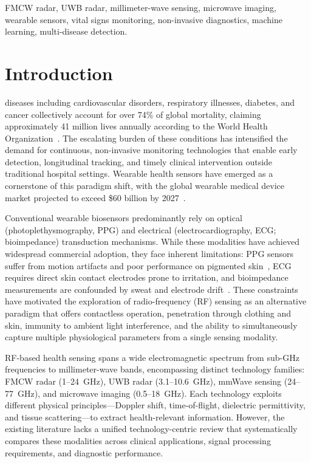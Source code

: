 \documentclass[journal,twoside]{IEEEtran}
\begin{document}
\begin{IEEEkeywords}
FMCW radar, UWB radar, millimeter-wave sensing, microwave imaging, wearable sensors, vital signs monitoring, non-invasive diagnostics, machine learning, multi-disease detection.
\end{IEEEkeywords}

\section{Introduction}

 diseases including cardiovascular disorders, respiratory illnesses, diabetes, and cancer collectively account for over 74\% of global mortality, claiming approximately 41 million lives annually according to the World Health Organization~\cite{ref_who2024}. The escalating burden of these conditions has intensified the demand for continuous, non-invasive monitoring technologies that enable early detection, longitudinal tracking, and timely clinical intervention outside traditional hospital settings. Wearable health sensors have emerged as a cornerstone of this paradigm shift, with the global wearable medical device market projected to exceed \$60 billion by 2027~\cite{ref_market2024}.

Conventional wearable biosensors predominantly rely on optical (photoplethysmography, PPG) and electrical (electrocardiography, ECG; bioimpedance) transduction mechanisms. While these modalities have achieved widespread commercial adoption, they face inherent limitations: PPG sensors suffer from motion artifacts and poor performance on pigmented skin~\cite{ref_ppg_limits2023}, ECG requires direct skin contact electrodes prone to irritation, and bioimpedance measurements are confounded by sweat and electrode drift~\cite{ref_bioimpedance2024}. These constraints have motivated the exploration of radio-frequency (RF) sensing as an alternative paradigm that offers contactless operation, penetration through clothing and skin, immunity to ambient light interference, and the ability to simultaneously capture multiple physiological parameters from a single sensing modality.

RF-based health sensing spans a wide electromagnetic spectrum from sub-GHz frequencies to millimeter-wave bands, encompassing distinct technology families: FMCW radar (1--24~GHz), UWB radar (3.1--10.6~GHz), mmWave sensing (24--77~GHz), and microwave imaging (0.5--18~GHz). Each technology exploits different physical principles---Doppler shift, time-of-flight, dielectric permittivity, and tissue scattering---to extract health-relevant information. However, the existing literature lacks a unified technology-centric review that systematically compares these modalities across clinical applications, signal processing requirements, and diagnostic performance.
\end{document}
